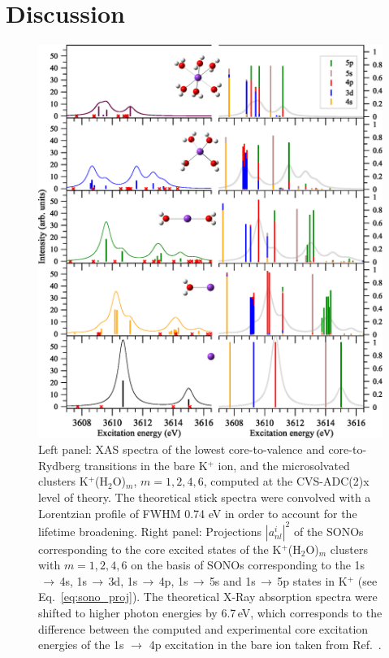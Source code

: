 \section{Discussion}\label{sec:disc}

\begin{figure}
\centering
\includegraphics[scale=0.6]{figures/fg1_kh2on_xas_overlaps.eps}
\caption{Left panel: XAS spectra of the lowest core-to-valence and core-to-Rydberg transitions in the bare K$^{+}$ ion, and the microsolvated clusters K$^{+}$(H$_2$O)$_m$, $m = 1, 2, 4, 6$, computed at the CVS-ADC(2)x level of theory. The theoretical stick spectra were convolved with a Lorentzian profile of FWHM 0.74 eV in order to account for the lifetime broadening. Right panel: Projections $|a_{nl}^{i}|^2$ of the SONOs corresponding to the core excited states of the K$^{+}$(H$_2$O)$_m$ clusters with $m = 1, 2, 4, 6$ on the basis of SONOs corresponding to the 1s$\,\rightarrow\,$4s, 1s$\,\rightarrow\,$3d, 1s$\,\rightarrow\,$4p, 1s$\,\rightarrow\,$5s and 1s$\,\rightarrow\,$5p states in K$^+$ (see Eq.\ \eqref{eq:sono_proj}).
The theoretical X-Ray absorption spectra were shifted to higher photon energies by 6.7\,eV, which corresponds to the difference between the computed and experimental core excitation energies of the 1s $\rightarrow$ 4p excitation in the bare ion taken from Ref.\ \citep{hertlein06:062715}.}
\label{fg:knw_xas}
\end{figure}


